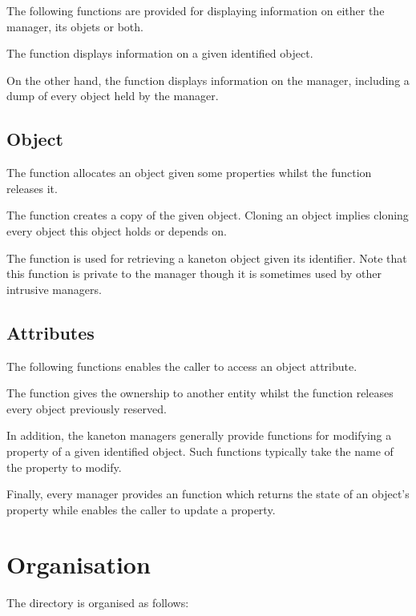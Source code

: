 The following functions are provided for displaying information on either
the manager, its objets or both.

The function  displays information on a given identified object.

On the other hand, the  function displays information on the
manager, including a dump of every object held by the manager.


\subsection*{Object}

The function  allocates an object given some properties
whilst the  function releases it.

The function  creates a copy of the given object. Cloning an
object implies cloning every object this object holds or depends on.

The  function is used for retrieving a kaneton object given its
identifier. Note that this function is private to the manager though it is
sometimes used by other intrusive managers.


\subsection*{Attributes}

The following functions enables the caller to access an object attribute.

The function  gives the ownership to another entity whilst
the function  releases every object previously reserved.

In addition, the kaneton managers generally provide functions for modifying
a property of a given identified object. Such functions typically take the
name of the property to modify.

Finally, every manager provides an  function which
returns the state of an object's property while  enables the
caller to update a property.

%
%

\section{Organisation}

The  directory is organised as follows:

